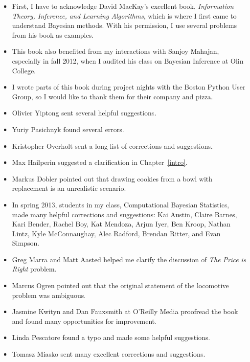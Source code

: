 \documentclass[12pt]{book}
\theoremstyle{exercise}
\begin{document}
\begin{itemize}

\item First, I have to acknowledge David MacKay's excellent book,
  {\it Information Theory, Inference, and Learning Algorithms}, which is
  where I first came to understand Bayesian methods.  With his
  permission, I use several problems from
  his book as examples.

\item This book also benefited from my interactions with Sanjoy
  Mahajan, especially in fall 2012, when I audited his class on
  Bayesian Inference at Olin College.

\item I wrote parts of this book during project nights with the Boston
  Python User Group, so I would like to thank them for their
  company and pizza.

\item Olivier Yiptong sent several helpful suggestions.

\item Yuriy Pasichnyk found several errors.

\item Kristopher Overholt sent a long list of corrections and suggestions.

\item Max Hailperin suggested a clarification in Chapter~\ref{intro}.

\item Markus Dobler pointed out that drawing cookies from a bowl
with replacement is an unrealistic scenario.

\item In spring 2013, students in my class, Computational Bayesian
  Statistics, made many helpful corrections and suggestions: Kai
  Austin, Claire Barnes, Kari Bender, Rachel Boy, Kat Mendoza, Arjun
  Iyer, Ben Kroop, Nathan Lintz, Kyle McConnaughay, Alec Radford,
  Brendan Ritter, and Evan Simpson.

\item Greg Marra and Matt Aasted helped me clarify the discussion of
  {\it The Price is Right} problem.

\item Marcus Ogren pointed out that the original statement of the
  locomotive problem was ambiguous.

\item Jasmine Kwityn and Dan Fauxsmith at O'Reilly Media proofread the
  book and found many opportunities for improvement.

\item Linda Pescatore found a typo and made some helpful suggestions.

\item Tomasz Miasko sent many excellent corrections and suggestions.


\end{itemize}
\end{document}
